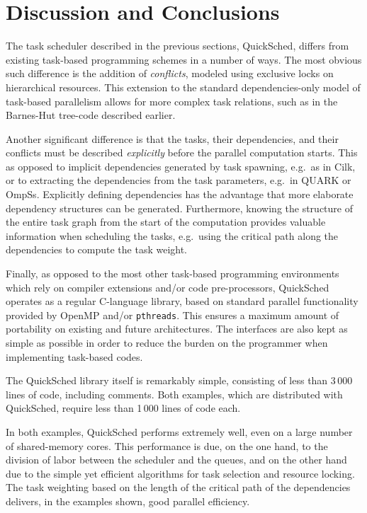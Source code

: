\documentclass[preprint]{elsarticle}
\begin{document}
\section{Discussion and Conclusions}

The task scheduler described in the previous sections, QuickSched,
differs from existing task-based programming schemes
in a number of ways.
The most obvious such difference is the addition of {\em conflicts},
modeled using exclusive locks on hierarchical resources.
This extension to the standard dependencies-only model
of task-based parallelism allows for more complex task relations,
such as in the Barnes-Hut tree-code described earlier.

Another significant difference is that the tasks, their
dependencies, and their conflicts must be described
{\em explicitly} before the parallel computation starts.
This as opposed to implicit dependencies generated
by task spawning, e.g.~as in Cilk, or to extracting the
dependencies from the task parameters, e.g.~in QUARK or OmpSs.
Explicitly defining dependencies has the advantage that 
more elaborate dependency structures can be generated.
Furthermore, knowing the structure of the entire task
graph from the start of the computation provides valuable
information when scheduling the tasks, e.g.~using the 
critical path along the dependencies to compute the
task weight.

Finally, as opposed to the most other task-based
programming environments which rely on compiler extensions
and/or code pre-processors, QuickSched operates as a regular
C-language library, based on standard parallel functionality
provided by OpenMP and/or {\tt pthreads}.
This ensures a maximum amount of portability on existing
and future architectures.
The interfaces are also kept as simple
as possible in order to reduce the burden on the programmer
when implementing task-based codes.

The QuickSched library itself is remarkably simple, consisting of
less than 3\,000 lines of code, including comments.
Both examples, which are distributed with QuickSched,
require less than 1\,000 lines of code each.

In both examples, QuickSched performs extremely well, even
on a large number of shared-memory cores.
This performance is due, on the one hand, to the
division of labor between the scheduler and the queues,
and on the other hand due to the simple yet efficient
algorithms for task selection and resource locking.
The task weighting based on the length of the critical
path of the dependencies delivers, in the examples shown,
good parallel efficiency.
\end{document}
